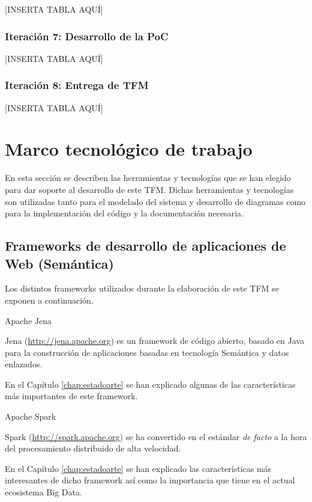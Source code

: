 [INSERTA TABLA AQUÍ]

\subsubsection{Iteración 7: Desarrollo de la PoC}


[INSERTA TABLA AQUÍ]


\subsubsection{Iteración 8: Entrega de \acs{TFM}}


[INSERTA TABLA AQUÍ]

\section{Marco tecnológico de trabajo}

\label{sec:marcotrabajo}

En esta sección se describen las herramientas y tecnologías que se han elegido
para dar soporte al desarrollo de este \acs{TFM}. Dichas herramientas y tecnologías
son utilizadas tanto para el modelado del sistema y desarrollo de diagramas como
para la implementación del código y la documentación necesaria. 

\subsection{Frameworks de desarrollo de aplicaciones de Web (Semántica)}

Los distintos frameworks utilizados durante la elaboración de este \acs{TFM} se
exponen a continuación. 

\begin{definitionlist} 

\item[Apache Jena]

Jena (\url{http://jena.apache.org}) es un framework de código abierto, basado en
Java para la construcción de aplicaciones basadas en tecnología Semántica y
datos enlazados. 

En el Capítulo \ref{chap:estadoarte} se han explicado algunas de las
características más importantes de este framework. 

\item[Apache Spark]

  Spark (\url{http://spark.apache.org}) se ha convertido en el estándar
  \textit{de facto} a la hora del procesamiento distribuido de alta velocidad.

  En el Capítulo \ref{chap:estadoarte} se han explicado las características más
  interesantes de dicho framework así como la importancia que tiene en el actual
  ecosistema Big Data. 

\end{definitionlist}

